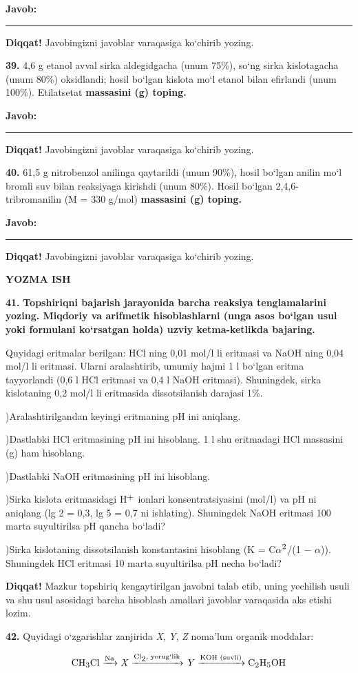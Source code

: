 \documentclass[11pt,a4paper]{article}
\renewcommand{\textsubscript}[1]{\ensuremath{_{\text{\fontsize{8}{8}\selectfont #1}}}}
\renewcommand{\textsuperscript}[1]{\ensuremath{^{\text{\fontsize{8}{8}\selectfont #1}}}}
\newcommand{\diqqat}[1]{\par\smallskip\noindent\textbf{Diqqat!} #1\par\medskip}
\newcommand{\javob}{\par\smallskip\noindent\textbf{Javob:} \rule[-2pt]{7.5cm}{0.4pt}\par\smallskip\noindent\textbf{Diqqat!} Javobingizni javoblar varaqasiga ko`chirib yozing.\par\medskip}
\begin{document}
\javob
\noindent\textbf{39.} 4,6 g etanol avval sirka aldegidgacha (unum 75\%), so`ng sirka kislotagacha (unum 80\%) oksidlandi; hosil bo`lgan kislota mo`l etanol bilan efirlandi (unum 100\%). Etilatsetat \textbf{massasini (g) toping.}
\javob
\noindent\textbf{40.} 61,5 g nitrobenzol anilinga qaytarildi (unum 90\%), hosil bo`lgan anilin mo`l bromli suv bilan reaksiyaga kirishdi (unum 80\%). Hosil bo`lgan 2,4,6-tribromanilin (M = 330 g/mol) \textbf{massasini (g) toping.}
\javob
\par\bigskip\begin{center}\textbf{\fontsize{13}{15}\selectfont YOZMA ISH}\end{center}
\noindent\textbf{41.} \textbf{Topshiriqni bajarish jarayonida barcha reaksiya tenglamalarini yozing. Miqdoriy va arifmetik hisoblashlarni (unga asos bo`lgan usul yoki formulani ko`rsatgan holda) uzviy ketma-ketlikda bajaring.}\par\smallskip
Quyidagi eritmalar berilgan: HCl ning 0,01 mol/l li eritmasi va NaOH ning 0,04 mol/l li eritmasi. Ularni aralashtirib, umumiy hajmi 1 l bo`lgan eritma tayyorlandi (0,6 l HCl eritmasi va 0,4 l NaOH eritmasi). Shuningdek, sirka kislotaning 0,2 mol/l li eritmasida dissotsilanish darajasi 1\%.\par
{})Aralashtirilgandan keyingi eritmaning pH ini aniqlang.\par
{})Dastlabki HCl eritmasining pH ini hisoblang. 1 l shu eritmadagi HCl massasini (g) ham hisoblang.\par
{})Dastlabki NaOH eritmasining pH ini hisoblang.\par
{})Sirka kislota eritmasidagi H\textsuperscript{+} ionlari konsentratsiyasini (mol/l) va pH ni aniqlang (lg 2 = 0,3, lg 5 = 0,7 ni ishlating). Shuningdek NaOH eritmasi 100 marta suyultirilsa pH qancha bo`ladi?\par
{})Sirka kislotaning dissotsilanish konstantasini hisoblang (K = C$\alpha$\textsuperscript{2}/(1 $-$ $\alpha$)). Shuningdek HCl eritmasi 10 marta suyultirilsa pH necha bo`ladi?\par
\diqqat{Mazkur topshiriq kengaytirilgan javobni talab etib, uning yechilish usuli va shu usul asosidagi barcha hisoblash amallari javoblar varaqasida aks etishi lozim.}
\noindent\textbf{42.} Quyidagi o`zgarishlar zanjirida \textit{X}, \textit{Y}, \textit{Z} noma'lum organik moddalar:\par
\[\setlength{\fboxsep}{0pt}\text{CH\textsubscript{3}Cl}\xrightarrow{\text{Na}}\text{\textit{X}}\xrightarrow{\text{Cl\textsubscript{2}, yorug`lik}}\text{\textit{Y}}\xrightarrow{\text{KOH (suvli)}}\text{C\textsubscript{2}H\textsubscript{5}OH}\]
\end{document}

